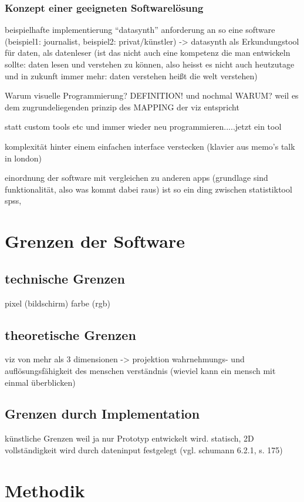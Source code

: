 \documentclass[a4paper, 12pt, onepage, pdftex, headsepline, footsepline]{scrreprt}
\begin{document}
\subsection{Konzept einer geeigneten Softwarelösung}
beispielhafte implementierung “datasynth”
anforderung an so eine software (beispiel1: journalist, beispiel2: privat/künstler)
-> datasynth als Erkundungstool für daten, als datenleser (ist das nicht auch eine kompetenz die man entwickeln sollte: daten lesen und verstehen zu können, also heisst es nicht auch heutzutage und in zukunft immer mehr: daten verstehen heißt die welt verstehen)

Warum visuelle Programmierung? DEFINITION! und nochmal WARUM?
weil es dem zugrundeliegenden prinzip des MAPPING der viz entspricht

statt custom tools etc und immer wieder neu programmieren.....jetzt ein tool

komplexität hinter einem einfachen interface verstecken (klavier aus memo’s talk in london)

einordnung der software mit vergleichen zu anderen apps (grundlage sind funktionalität, also was kommt dabei raus) ist so ein ding zwischen statistiktool spss, 

\chapter{Grenzen der Software}
\section{technische Grenzen}
pixel (bildschirm)
farbe (rgb)
\section{theoretische Grenzen}
viz von mehr als 3 dimensionen -> projektion
wahrnehmungs- und auflösungsfähigkeit des menschen
verständnis (wieviel kann ein mensch mit einmal überblicken)
\section{Grenzen durch Implementation}
künstliche Grenzen weil ja nur Prototyp entwickelt wird.
statisch, 2D vollständigkeit wird durch dateninput festgelegt (vgl. schumann 6.2.1, s. 175)


\chapter{Methodik}
\end{document}
